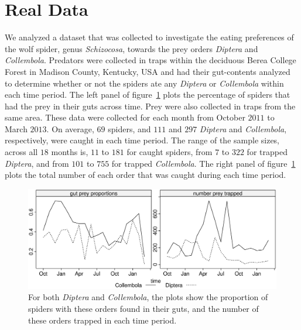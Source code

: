 \section{Real Data}
\label{sec:data}

We analyzed a dataset that was collected to investigate the eating preferences of the wolf spider, genus \textit{Schizocosa}, towards the prey orders \textit{Diptera} and \textit{Collembola}.  Predators were collected in traps within the deciduous Berea College Forest in Madison County, Kentucky, USA and had their gut-contents analyzed to determine whether or not the spiders ate any \textit{Diptera} or \textit{Collembola} within each time period.  The left panel of figure~\ref{fig:data} plots the percentage of spiders that had the prey in their guts across time.  Prey were also collected in traps from the same area.  These data were collected for each month from October $2011$ to March $2013$.  On average, $69$ spiders, and $111$ and $297$ \textit{Diptera} and \textit{Collembola}, respectively, were caught in each time period.  The range of the sample sizes, across all $18$ months is, $11$ to $181$ for caught spiders, from $7$ to $322$ for trapped \textit{Diptera}, and from $101$ to $755$ for trapped \textit{Collembola}.  The right panel of figure~\ref{fig:data} plots the total number of each order that was caught during each time period. 

\begin{figure}
  \centering
  \includegraphics[scale=0.5]{data}
  \caption{For both \textit{Diptera} and \textit{Collembola}, the plots show the proportion of spiders with these orders found in their guts, and the number of these orders trapped in each time period.}
  \label{fig:data}
\end{figure}


